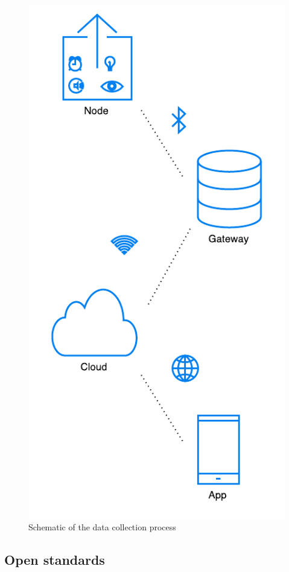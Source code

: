 \documentclass{below-ext}
\begin{document}
\begin{figure}
\label{fig:process}
\centering
\includegraphics[scale=0.6]{dataproces.pdf}
\caption{Schematic of the data collection process}
\end{figure}

\subsection{Open standards}
\end{document}
